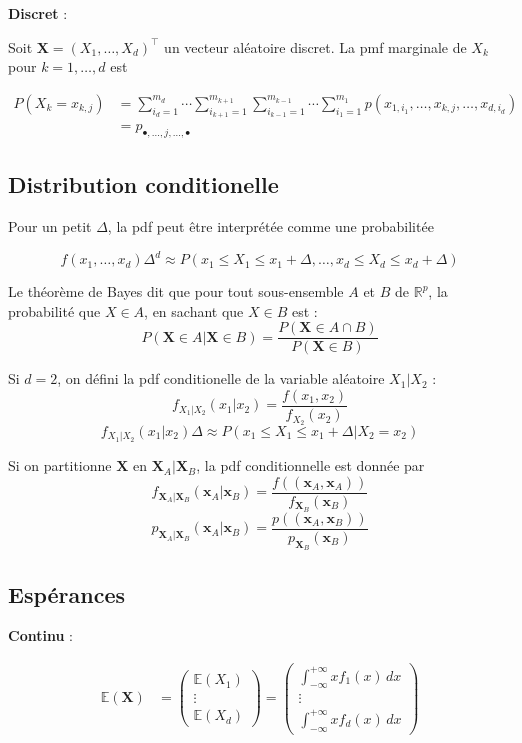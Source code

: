 \documentclass[12pt,a4paper]{article}
\begin{document}
\bigskip

\textbf{Discret} :

Soit $\mathbf{X}=(X_1, \dots, X_d)^\top$ un vecteur aléatoire discret. La pmf marginale de $X_k$ pour $k=1,\dots,d$ est

\begin{align*}
P(X_k = x_{k,j}) &= \sum_{i_d=1}^{m_d} \cdots \sum_{i_{k+1}=1}^{m_{k+1}} \sum_{i_{k-1}=1}^{m_{k-1}} \cdots \sum_{i_1=1}^{m_1} p(x_{1,i_1}, \ldots, x_{k,j}, \ldots, x_{d,i_d}) \\
&= p_{\bullet,\ldots,j,\ldots,\bullet}
\end{align*}


\subsection{Distribution conditionelle}

Pour un petit $\Delta$, la pdf peut être interprétée comme une probabilitée

$$f(x_1,\dots,x_d) \Delta^d \approx P(x_1 \leq X_1 \leq x_1 + \Delta, \dots, x_d \leq X_d \leq x_d + \Delta)$$

Le théorème de Bayes dit que pour tout sous-ensemble $A$ et $B$ de $\mathbb{R}^p$, la probabilité que $X\in A$, en sachant que $X \in B$ est :
$$P(\mathbf{X} \in A | \mathbf{X} \in B) = \frac{P(\mathbf{X} \in A \cap B)}{P(\mathbf{X} \in B)}$$

Si $d=2$, on défini la pdf conditionelle de la variable aléatoire $X_1|X_2$ :
$$f_{X_1|X_2}(x_1|x_2) = \frac{f(x_1,x_2)}{f_{X_2}(x_2)}$$
$$f_{X_1|X_2}(x_1|x_2)\Delta \approx P(x_1 \leq X_1 \leq x_1 + \Delta | X_2=x_2)$$

Si on partitionne $\mathbf{X}$ en $\mathbf{X}_A | \mathbf{X}_B$, la pdf conditionnelle est donnée par
$$f_{\mathbf{X}_A|\mathbf{X}_B} (\mathbf{x}_A|\mathbf{x}_B) = \frac{f((\mathbf{x}_A,\mathbf{x}_A))}{f_{\mathbf{X}_B}(\mathbf{x}_B)}$$
$$p_{\mathbf{X}_A|\mathbf{X}_B} (\mathbf{x}_A|\mathbf{x}_B) = \frac{p((\mathbf{x}_A,\mathbf{x}_B))}{p_{\mathbf{X}_B}(\mathbf{x}_B)}$$


\subsection{Espérances}

\textbf{Continu} :

\begin{align*}
    \mathbb{E}(\mathbf{X}) &= \begin{pmatrix}
        \mathbb{E}(X_1) \\
        \vdots \\
        \mathbb{E}(X_d)
    \end{pmatrix} = \begin{pmatrix}
        \int_{-\infty}^{+\infty} x f_1(x) \,dx \\
        \vdots \\
        \int_{-\infty}^{+\infty} x f_d(x) \,dx
    \end{pmatrix}
\end{align*}
\end{document}
